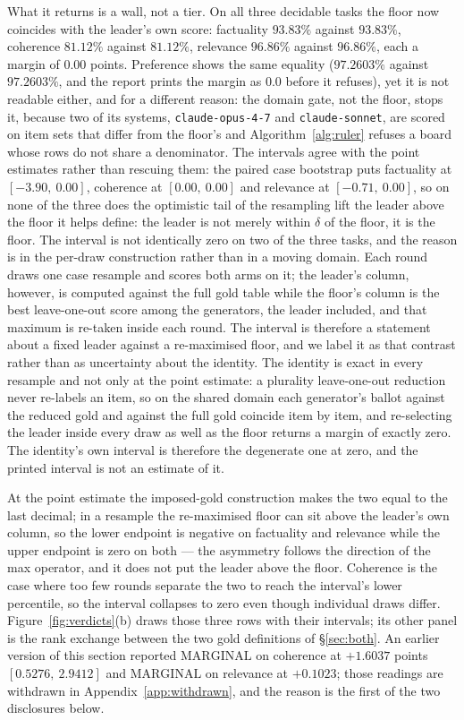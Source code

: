 \documentclass{article}
\newcommand{\ids}[1]{\texttt{\small #1}} %
\begin{document}
What it returns is a wall, not a tier. On all three decidable tasks the floor now coincides with the leader's
own score: factuality $93.83\%$ against $93.83\%$, coherence $81.12\%$ against $81.12\%$, relevance
$96.86\%$ against $96.86\%$, each a margin of $0.00$ points. Preference shows the same equality
($97.2603\%$ against $97.2603\%$, and the report prints the margin as $0.0$ before it refuses), yet it is not
readable either, and for a different reason: the domain gate, not the floor, stops it, because two of its
systems, \ids{claude-opus-4-7} and \ids{claude-sonnet}, are scored on item sets that differ from the floor's
and Algorithm~\ref{alg:ruler} refuses a board whose rows do not share a denominator. The intervals agree with the point estimates rather than rescuing them: the paired case bootstrap puts
factuality at $[-3.90,\ 0.00]$, coherence at $[0.00,\ 0.00]$ and relevance at $[-0.71,\ 0.00]$, so on none of
the three does the optimistic tail of the resampling lift the leader above the floor it helps define: the leader is
not merely within $\delta$ of the floor, it is the floor. The interval is not identically zero on two of the three tasks, and the reason is in the per-draw construction rather than in a moving domain. Each round draws one case resample and scores both arms on it; the leader's column, however, is computed against the full gold table while the floor's column is the best leave-one-out score among the generators, the leader included, and that maximum is re-taken inside each round. The interval is therefore a statement about a fixed leader against a re-maximised floor, and we label it as that contrast rather than as uncertainty about the identity. The identity is exact in every resample and not only at the point estimate: a plurality leave-one-out reduction never re-labels an item, so on the shared domain each generator's ballot against the reduced gold and against the full gold coincide item by item, and re-selecting the leader inside every draw as well as the floor returns a margin of exactly zero. The identity's own interval is therefore the degenerate one at zero, and the printed interval is not an estimate of it. 

At the point estimate the imposed-gold construction makes the two equal to the last decimal; in a resample the re-maximised floor can sit above the leader's own column, so the lower endpoint is negative on factuality and relevance while the upper endpoint is zero on both --- the asymmetry follows the direction of the max operator, and it does not put the leader above the floor. Coherence is the case where too few rounds separate the two to reach the interval's lower percentile, so the interval collapses to zero even though individual draws differ. Figure~\ref{fig:verdicts}(b) draws those three rows with
their intervals; its other panel is the rank exchange between the two gold definitions of \S\ref{sec:both}.
An earlier version of this section reported
$\mathrm{MARGINAL}$ on coherence at $+1.6037$ points $[0.5276,\ 2.9412]$ and $\mathrm{MARGINAL}$ on relevance at
$+0.1023$; those readings are withdrawn in Appendix~\ref{app:withdrawn}, and the reason is the first of the two
disclosures below.
\end{document}
